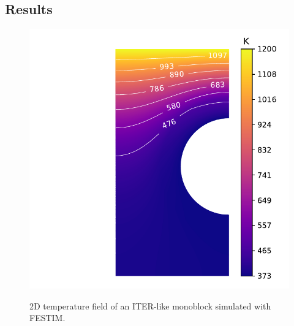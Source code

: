 




\subsection{Results}
\begin{figure}
    \centering
    \includegraphics[width=0.5\linewidth]{Figures/Chapter3/monoblocks/interface_condition/iter case/temperature_field_2d.pdf}
    \label{fig: 2D temperature}
    \caption{2D temperature field of an ITER-like monoblock simulated with FESTIM.}
\end{figure}


